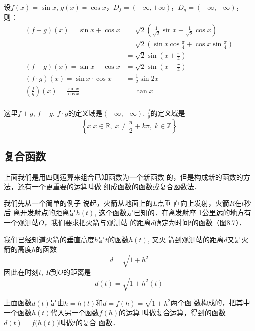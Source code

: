 \begin{example}
设$f(x)=\sin x$, $g(x)=\cos x$，$D_f=(-\infty,+\infty)$，$D_g=(-\infty,+\infty)$，则：
\[\begin{split}
    (f+g)(x)=\sin x+\cos x&=\sqrt{2}\left(\frac{1}{\sqrt{2}}\sin x+\frac{1}{\sqrt{2}}\cos x\right)\\
    &=\sqrt{2}\left(\sin x\cos\frac{\pi}{4}+\cos x\sin\frac{\pi}{4} \right)\\
    &=\sqrt{2}\sin\left(x+\frac{\pi}{4}\right)\\
    (f-g)(x)=\sin x-\cos x&=\sqrt{2}\sin\left(x-\frac{\pi}{4}\right)\\
    (f\cdot g)(x)=\sin x\cdot \cos x&=\frac{1}{2}\sin 2x\\
    \left(\frac{f}{g}\right)(x)=\frac{\sin x}{\cos x}&=\tan x\\
\end{split}\]    

这里$f+g$, $f-g$, $f\cdot g$的定义域是$(-\infty,+\infty)$, $\frac{f}{g}$的定义域是$$\left\{x\big|x\in\mathbb{R},\; x\ne \frac{\pi}{2}+k\pi,\; k\in \mathbb{Z}\right\}$$
\end{example}

\subsection{复合函数}
上面我们是用四则运算来组合已知函数为一个新函数
的，但是构成新的函数的方法，还有一个更重要的运算叫做
组成函数的函数或复合函数法．

我们先从一个简单的例子
说起，火箭从地面上的$L$点垂
直向上发射，火箭$R$在$t$秒后
离开发射点的距离是$h(t)$, 这个函数是已知的．在离发射座
1公里远的地方有一个观测站$O$，我们要求把火箭与观测站
的距离$d$确定为时间$t$的函数（图8.7）．
\begin{figure}[htp]
    \centering
{}
    \caption{}
\end{figure}

我们已经知道火箭的垂直高度$h$是$t$的函数$h(t)$, 又火
箭到观测站的距离$d$又是火箭的高度$h$的函数
\[d=\sqrt{1+h^2}\]
因此在时刻$t$, $R$到$O$的距离是
\[d(t)=\sqrt{1+h^2(t)}\]

上面函数$d(t)$是由$h=h(t)$和$d=f(h)=\sqrt{1+h^2}$两个函
数构成的，把其中一个函数$h(t)$代入另一个函数$f(h)$的运算
叫做复合运算，得到的函数$d(t)=f\big(h(t)\big)$叫做$t$的复合
函数．

